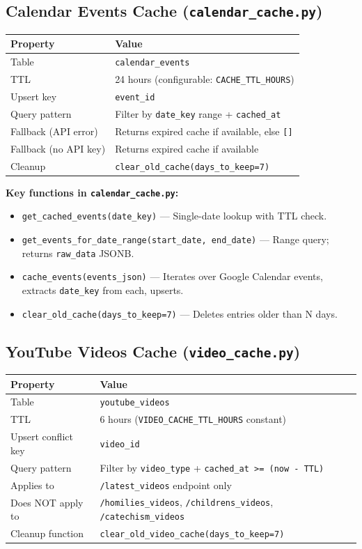 \documentclass[12pt]{article}
\begin{document}
\subsection{Calendar Events Cache (\texttt{calendar\_cache.py})}

\begin{longtable}{p{3.5cm}p{9cm}}
\toprule
\textbf{Property} & \textbf{Value} \\
\midrule
Table & \texttt{calendar\_events} \\
TTL & 24 hours (configurable: \texttt{CACHE\_TTL\_HOURS}) \\
Upsert key & \texttt{event\_id} \\
Query pattern & Filter by \texttt{date\_key} range + \texttt{cached\_at} \\
Fallback (API error) & Returns expired cache if available, else \texttt{[]} \\
Fallback (no API key) & Returns expired cache if available \\
Cleanup & \texttt{clear\_old\_cache(days\_to\_keep=7)} \\
\bottomrule
\end{longtable}

\textbf{Key functions in \texttt{calendar\_cache.py}:}
\begin{itemize}
    \item \texttt{get\_cached\_events(date\_key)} --- Single-date lookup with TTL check.
    \item \texttt{get\_events\_for\_date\_range(start\_date, end\_date)} --- Range query; returns \texttt{raw\_data} JSONB.
    \item \texttt{cache\_events(events\_json)} --- Iterates over Google Calendar events, extracts \texttt{date\_key} from each, upserts.
    \item \texttt{clear\_old\_cache(days\_to\_keep=7)} --- Deletes entries older than N days.
\end{itemize}

\subsection{YouTube Videos Cache (\texttt{video\_cache.py})}

\begin{longtable}{lp{10cm}}
\toprule
\textbf{Property} & \textbf{Value} \\
\midrule
Table & \texttt{youtube\_videos} \\
TTL & 6 hours (\texttt{VIDEO\_CACHE\_TTL\_HOURS} constant) \\
Upsert conflict key & \texttt{video\_id} \\
Query pattern & Filter by \texttt{video\_type} + \texttt{cached\_at >= (now - TTL)} \\
Applies to & \texttt{/latest\_videos} endpoint only \\
Does NOT apply to & \texttt{/homilies\_videos}, \texttt{/childrens\_videos}, \texttt{/catechism\_videos} \\
Cleanup function & \texttt{clear\_old\_video\_cache(days\_to\_keep=7)} \\
\bottomrule
\end{longtable}
\end{document}
